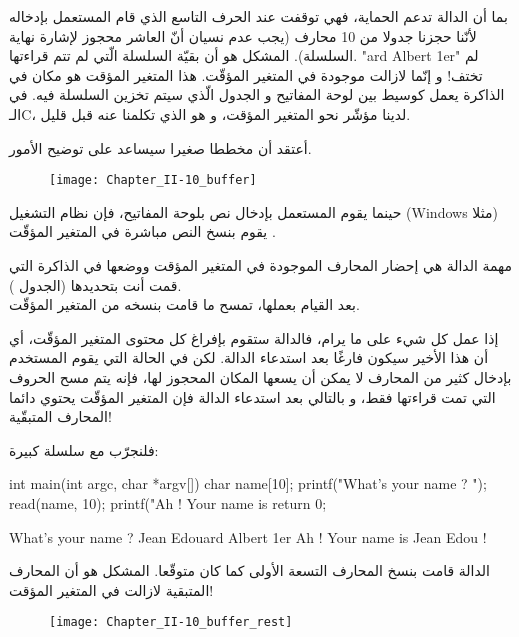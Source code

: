 بما أن الدالة
تدعم الحماية، فهي توقفت عند الحرف التاسع الذي قام المستعمل بإدخاله لأنّنا حجزنا جدولا من 10 محارف (يجب عدم نسيان أنّ العاشر محجوز لإشارة نهاية السلسلة).
المشكل هو أن بقيّة السلسلة الّتي لم تتم قراءتها.
"\textenglish{ard Albert 1er}"
لم تختف! و إنّما لازالت موجودة في المتغير المؤقّت. هذا المتغير المؤقت هو مكان في الذاكرة يعمل كوسيط بين لوحة المفاتيح و الجدول الّذي سيتم تخزين السلسلة فيه. في الـ\textenglish{C}،
لدينا مؤشّر نحو المتغير المؤقت، و هو
الذي تكلمنا عنه قبل قليل.

أعتقد أن مخططا صغيرا سيساعد على توضيح الأمور.

\begin{figure}[H]
	\centering
	\texttt{[image: Chapter\_II-10\_buffer]}
\end{figure}

حينما يقوم المستعمل بإدخال نص بلوحة المفاتيح، فإن نظام التشغيل 
(\textenglish{Windows}
مثلا) يقوم بنسخ النص مباشرة في المتغير المؤقّت
.

مهمة الدالة
هي إحضار المحارف الموجودة في المتغير المؤقت ووضعها في الذاكرة التي قمت أنت بتحديدها (الجدول
).\\
بعد القيام بعملها، تمسح ما قامت بنسخه من المتغير المؤقّت.

إذا عمل كل شيء على ما يرام، فالدالة
ستقوم بإفراغ كل محتوى المتغير المؤقّت، أي أن هذا الأخير سيكون فارغًا بعد استدعاء الدالة. لكن في الحالة التي يقوم المستخدم بإدخال كثير من المحارف لا يمكن أن يسعها المكان المحجوز لها، فإنه يتم مسح الحروف التي تمت قراءتها فقط، و بالتالي بعد استدعاء الدالة
فإن المتغير المؤقّت يحتوي دائما المحارف المتبقّية!

فلنجرّب مع سلسلة كبيرة:

\begin{Csource}
  int main(int argc, char *argv[])
  {
  	char name[10];
  	printf("What's your name ? ");
  	read(name, 10);
  	printf("Ah ! Your name is %
  	return 0;
  }
\end{Csource}

\begin{Console}
  What's your name ? Jean Edouard Albert 1er
  Ah ! Your name is Jean Edou !
\end{Console}

الدالة
قامت بنسخ المحارف التسعة الأولى كما كان متوقّعا. المشكل هو أن المحارف المتبقية لازالت في المتغير المؤقت!

\begin{figure}[H]
	\centering
	\texttt{[image: Chapter\_II-10\_buffer\_rest]}
\end{figure}

